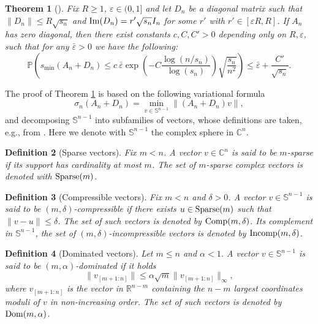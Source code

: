 \documentclass[11pt,oneside]{amsart}
\theoremstyle{plain}
\newtheorem{theorem}{Theorem}[section]
\newtheorem{definition}[theorem]{Definition}
\numberwithin{equation}{section}
\newcommand{\eps}{\varepsilon}
\newcommand{\p}{\mathbb{P}}
\newcommand{\scaling}{s_n}
\begin{document}
\begin{theorem}[{\cite[Theorem 11.3]{BasakRudelson19-arxiv}}] \label{thm:least-SV-sparse}
Fix $R \ge 1$, $\eps \in (0,1]$ and let $D_n$ be a diagonal matrix such that
$\|D_n\| \le R\sqrt{\scaling}$ and ${\rm Im}(D_n)= r'\sqrt{\scaling} I_n$ for some $r'$ with $r'\in [\eps R,R]$. 
If $A_n$ has zero diagonal, then there
exist constants $c,C,C'>0$
depending only on $R,\eps$, 
such that for any $\bar \eps > 0$ we have the following:
\begin{equation}
    \p\left(s_{\min}(A_n+D_n) \le c \ \bar \eps \exp\left(-C{ \frac{\log(n/\scaling)}{\log(\scaling)}}\right)\sqrt{\frac{\scaling}{n^2}}\right)\le \bar \eps +\frac{C'}{\sqrt{\scaling}}.
\end{equation}
\end{theorem}
The proof of Theorem \ref{thm:least-SV-sparse} is based on the following variational formula 
\begin{equation} \label{eq:sigman}\sigma_{n}(A_n + D_n) = \min_{v \in \mathbb{S}^{n-1}} \|(A_n + D_n)v\|,
\end{equation}
and decomposing $\mathbb{S}^{n-1}$ into subfamilies of vectors, whose definitions are taken, e.g., from \cite{RUDELSON2008600,BasakRudelson-invertibility}.
Here we denote with $\mathbb{S}^{n-1}$ the complex sphere in $\mathbb{C}^n$.
\begin{definition}[Sparse vectors]
    Fix $m < n$. A vector $v \in \mathbb{C}^n$ is said to be $m$-sparse if its support has cardinality at most $m$. The set of $m$-sparse complex vectors is denoted with ${\rm Sparse}(m)$.
\end{definition}
\begin{definition}[Compressible vectors]
    Fix $m < n$ and $\delta>0$. A vector $v \in \mathbb{S}^{n-1}$ is said to be $(m,\delta)$-compressible if there exists $u \in {\rm Sparse}(m)$ such that $\|v-u\|\le \delta$. The set of such vectors is denoted by ${\rm Comp}(m,\delta)$. Its complement in $\mathbb{S}^{n-1}$, the set of $(m,\delta)$-incompressible vectors is denoted by ${\rm Incomp}(m,\delta)$.
\end{definition}
\begin{definition}[Dominated vectors]
    Let $m \le  n$ and $\alpha<1$. A vector $v \in \mathbb{S}^{n-1}$ is said to be $(m,\alpha)$-dominated if it holds
    \begin{equation}
       \| v_{[m+1:n]}
\| \le \alpha\sqrt{m} \|v_{[m+1:n]}\|_{\infty},
\end{equation}
where $v_{[m+1:n]}$ is the vector in $\mathbb{R}^{n-m}$ containing the $n-m$ largest coordinates moduli of $v$ in non-increasing order. The set of such vectors is denoted by ${\rm Dom}(m,\alpha)$.
\end{definition}
\end{document}
